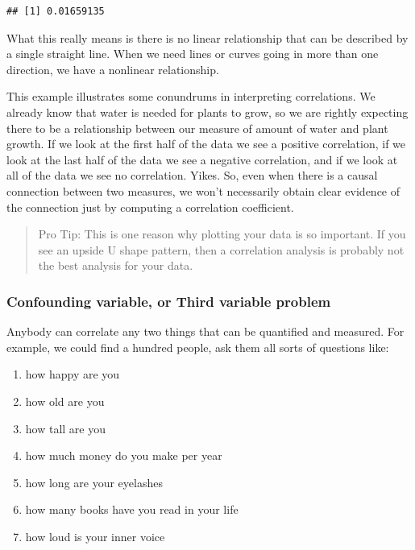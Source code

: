 \documentclass[]{book}
\providecommand{\tightlist}{%
  \setlength{\itemsep}{0pt}\setlength{\parskip}{0pt}}
\begin{document}
\begin{verbatim}
## [1] 0.01659135
\end{verbatim}

What this really means is there is no linear relationship that can be described by a single straight line. When we need lines or curves going in more than one direction, we have a nonlinear relationship.

This example illustrates some conundrums in interpreting correlations. We already know that water is needed for plants to grow, so we are rightly expecting there to be a relationship between our measure of amount of water and plant growth. If we look at the first half of the data we see a positive correlation, if we look at the last half of the data we see a negative correlation, and if we look at all of the data we see no correlation. Yikes. So, even when there is a causal connection between two measures, we won't necessarily obtain clear evidence of the connection just by computing a correlation coefficient.

\begin{quote}
Pro Tip: This is one reason why plotting your data is so important. If you see an upside U shape pattern, then a correlation analysis is probably not the best analysis for your data.
\end{quote}

\hypertarget{confounding-variable-or-third-variable-problem}{%
\subsubsection{Confounding variable, or Third variable problem}\label{confounding-variable-or-third-variable-problem}}

Anybody can correlate any two things that can be quantified and measured. For example, we could find a hundred people, ask them all sorts of questions like:

\begin{enumerate}
\def\labelenumi{\arabic{enumi}.}
\tightlist
\item
  how happy are you
\item
  how old are you
\item
  how tall are you
\item
  how much money do you make per year
\item
  how long are your eyelashes
\item
  how many books have you read in your life
\item
  how loud is your inner voice
\end{enumerate}
\end{document}

